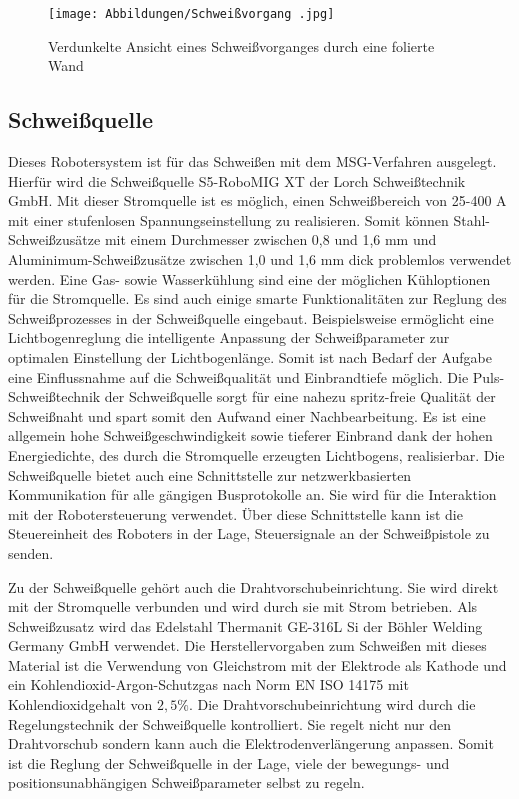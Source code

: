 \begin{figure}[h]
	\texttt{[image: Abbildungen/Schweißvorgang .jpg]}
	\centering
	\caption{Verdunkelte Ansicht eines Schweißvorganges durch eine folierte Wand}
\end{figure}

\subsection{Schweißquelle}

Dieses Robotersystem ist für das Schweißen mit dem MSG-Verfahren ausgelegt. Hierfür wird die Schweißquelle S5-RoboMIG XT der Lorch Schweißtechnik GmbH. Mit dieser Stromquelle ist es möglich, einen Schweißbereich von 25-400 A mit einer stufenlosen Spannungseinstellung zu realisieren. Somit können Stahl-Schweißzusätze mit einem Durchmesser zwischen 0,8 und 1,6 mm und Aluminimum-Schweißzusätze zwischen 1,0 und 1,6 mm dick  problemlos verwendet werden. Eine Gas- sowie Wasserkühlung sind eine der möglichen Kühloptionen für die Stromquelle. Es sind auch einige smarte Funktionalitäten zur Reglung des Schweißprozesses in der Schweißquelle eingebaut. Beispielsweise ermöglicht eine Lichtbogenreglung die intelligente Anpassung der Schweißparameter zur optimalen Einstellung der Lichtbogenlänge. Somit ist nach Bedarf der Aufgabe eine Einflussnahme auf die Schweißqualität und Einbrandtiefe möglich. Die Puls-Schweißtechnik der Schweißquelle sorgt für eine nahezu spritz-freie Qualität der Schweißnaht und spart somit den Aufwand einer Nachbearbeitung. Es ist eine allgemein hohe Schweißgeschwindigkeit sowie tieferer Einbrand dank der hohen Energiedichte, des durch die Stromquelle erzeugten Lichtbogens, realisierbar. Die Schweißquelle bietet auch eine Schnittstelle zur netzwerkbasierten Kommunikation für alle gängigen Busprotokolle an. Sie wird für die Interaktion mit der Robotersteuerung verwendet. Über diese Schnittstelle kann ist die Steuereinheit des Roboters in der Lage, Steuersignale an der Schweißpistole zu senden.

Zu der Schweißquelle gehört auch die Drahtvorschubeinrichtung. Sie wird direkt mit der Stromquelle verbunden und wird durch sie mit Strom betrieben. Als Schweißzusatz wird das Edelstahl Thermanit GE-316L Si der Böhler Welding Germany GmbH verwendet. Die Herstellervorgaben zum Schweißen mit dieses Material ist die Verwendung von Gleichstrom mit der Elektrode als Kathode und ein Kohlendioxid-Argon-Schutzgas nach Norm EN ISO 14175 mit Kohlendioxidgehalt von $2,5 \%$. Die Drahtvorschubeinrichtung wird durch die Regelungstechnik der Schweißquelle kontrolliert. Sie regelt nicht nur den Drahtvorschub sondern kann auch die Elektrodenverlängerung anpassen. Somit ist die Reglung der Schweißquelle in der Lage, viele der bewegungs- und positionsunabhängigen Schweißparameter selbst zu regeln. 

